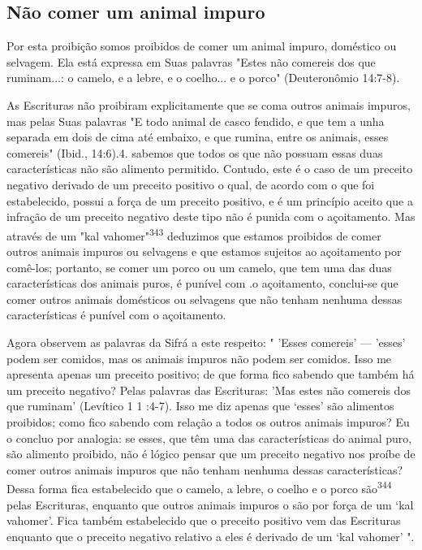 \begin{itemize}
\begin{enumrate}
\begin{itemize}
\begin{itemize}
\begin{itemize}
\section{Não comer um animal impuro}

Por esta proibição somos proibidos de comer um animal impuro, doméstico
ou selvagem. Ela está expressa em Suas palavras "Estes não come­reis dos
que ruminam...: o camelo, e a lebre, e o coelho... e o porco"
(Deutero­nômio 14:7-8).

As Escrituras não proibiram explicitamente que se coma outros ani­mais
impuros, mas pelas Suas palavras "E todo animal de casco fendido, e que
tem a unha separada em dois de cima até embaixo, e que rumina, entre os
ani­mais, esses comereis" (Ibid.,
14:6).4. sabemos que todos os que
não possuam essas duas características não são alimento permitido.
Contudo, este é o caso de um preceito negativo derivado de um preceito
positivo o qual, de acordo com o que foi estabelecido, possui a força de
um preceito positivo, e é um princípio aceito que a infração de um
preceito negativo deste tipo não é puni­da com o açoitamento. Mas
através de um "kal vahomer"\textsuperscript{343} deduzimos que estamos
proibidos de comer outros animais impuros ou selvagens e que esta­mos
sujeitos ao açoitamento por comê-los; portanto, se comer um porco ou um
camelo, que tem uma das duas características dos animais puros, é
puní­vel com .o açoitamento, conclui-se que comer outros animais
domésticos ou selvagens que não tenham nenhuma dessas características é
punível com o açoitamento.

Agora observem as palavras da Sifrá a este respeito: " 'Esses come­reis'
--- 'esses' podem ser comidos, mas os animais impuros não podem ser
co­midos. Isso me apresenta apenas um preceito positivo; de que forma
fico sa­bendo que também há um preceito negativo? Pelas palavras das
Escrituras: 'Mas estes não comereis dos que ruminam' (Levítico 1 1
:4-7). Isso me diz apenas que `esses' são alimentos proibidos; como fico
sabendo com relação a todos os ou­tros animais impuros? Eu o concluo por
analogia: se esses, que têm uma das características do animal puro, são
alimento proibido, não é lógico pensar que um preceito negativo nos
proíbe de comer outros animais impuros que não tenham nenhuma dessas
características? Dessa forma fica estabelecido que o camelo, a lebre, o
coelho e o porco são\textsuperscript{344} pelas Escrituras, enquanto que
ou­tros animais impuros o são por força de um `kal vahomer'. Fica também
estabe­lecido que o preceito positivo vem das Escrituras enquanto que o
preceito ne­gativo relativo a eles é derivado de um `kal vahomer' ".


\end{itemize}
\end{itemize}
\end{itemize}
\end{enumrate}
\end{itemize}
